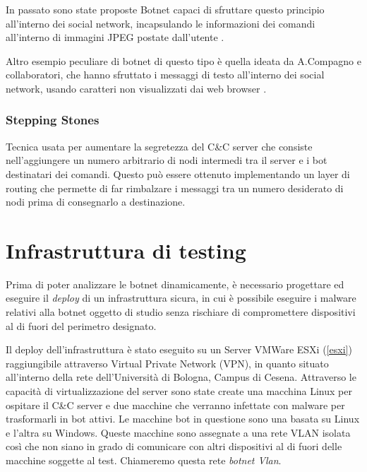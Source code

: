  In passato sono state proposte Botnet capaci di sfruttare questo principio all'interno dei social network, incapsulando le informazioni dei comandi all'interno di immagini JPEG postate dall'utente \cite{nagaraja2011stegobot}.

 Altro esempio peculiare di botnet di questo tipo è quella ideata da A.Compagno e collaboratori, che hanno sfruttato i messaggi di testo all'interno dei social network, usando caratteri non visualizzati dai web browser \cite{nagaraja2011stegobot}.


 \subsection*{Stepping Stones}
 
 Tecnica usata per aumentare la segretezza del C\&C server che consiste nell'aggiungere un numero arbitrario di nodi intermedi tra il server e i bot destinatari dei comandi.  Questo può essere ottenuto implementando un layer di routing che permette di far rimbalzare i messaggi tra un numero desiderato di nodi prima di consegnarlo a destinazione.














 

\chapter{Infrastruttura di testing}
Prima di poter analizzare le botnet dinamicamente, è necessario progettare ed eseguire il \textit{deploy} di un infrastruttura  sicura, in cui è possibile eseguire i malware relativi alla botnet oggetto di studio senza rischiare di compromettere dispositivi al di fuori del perimetro designato.


Il deploy dell'infrastruttura è stato eseguito su un Server VMWare ESXi (\ref{esxi})  raggiungibile attraverso Virtual Private Network (VPN), in quanto situato all'interno della rete dell'Università di Bologna, Campus di Cesena. Attraverso le capacità di virtualizzazione del server sono state create una macchina Linux per ospitare il C\&C server e due macchine che verranno infettate con malware per trasformarli in bot attivi. Le macchine bot in questione sono una basata su Linux e l'altra su Windows.  Queste macchine sono assegnate a una rete VLAN isolata così che non siano in grado di comunicare con altri dispositivi al di fuori delle macchine soggette al test. Chiameremo questa rete \textit{botnet Vlan}.

